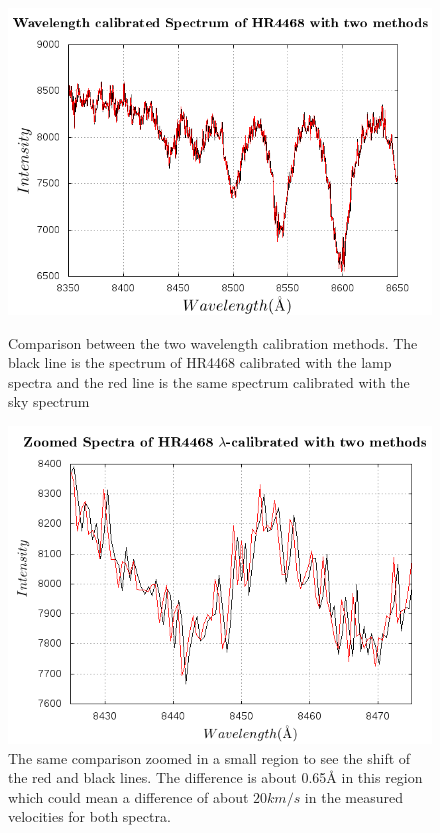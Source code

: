 \begin{figure}[]
  \centering
  \begin{minipage}[b]{0.49\textwidth}
    \includegraphics[width=\textwidth]{images/Espectros.png}
    \caption[Comparison between the two wavelength calibration methods]{Comparison between the two wavelength calibration methods. The black line is the spectrum of HR4468 calibrated with the lamp spectra and the red line is the same spectrum calibrated with the sky spectrum}
  \end{minipage}
  \hfill
  \begin{minipage}[b]{0.49\textwidth}
    \includegraphics[width=\textwidth]{images/Espectros2.png}
    \caption[Zoomed comparison between the two wavelength calibration methods]{The same comparison zoomed in a small region to see the shift of the red and black lines. The difference is about 0.65$\textrm{\AA}$ in this region which could mean a difference of about $20km/s$ in the measured velocities for both spectra.}
  \end{minipage}
\end{figure}

